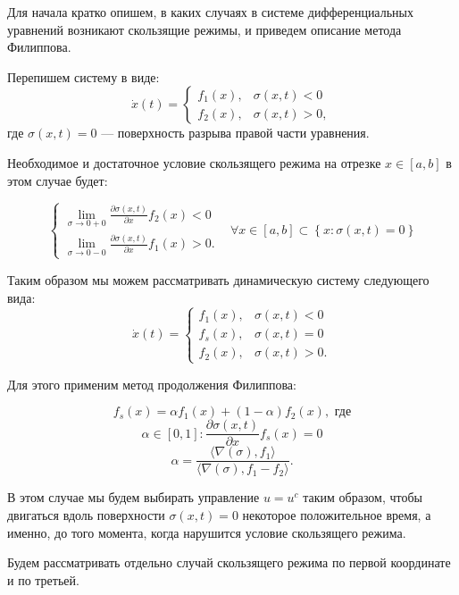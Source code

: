 \documentclass[11pt]{article}
\theoremstyle{definition}
\newcommand\Set[2]{\left\{ #1 \colon #2 \right\}}
\newcommand\dd[2]{\frac{\partial#1}{\partial#2}}
\begin{document}
	Для начала кратко опишем, в каких случаях в системе дифференциальных уравнений возникают скользящие режимы, и приведем описание метода Филиппова.

	Перепишем систему в виде:
$$\dot x(t) = \begin{cases} f_1(x), & \sigma(x,t) < 0 \\ f_2(x), & \sigma(x,t) > 0,\end{cases}$$
	где $\sigma(x,t) = 0$ --- поверхность разрыва правой части уравнения.

	Необходимое и достаточное условие скользящего режима на отрезке $x \in [a, b]$ в этом случае будет:

$$
\left\{
\begin{aligned}
    \lim_{\sigma \to 0+0}\dd{\sigma(x,t)}{x} f_2(x) < 0 \\
    \lim_{\sigma \to 0-0} \dd{\sigma(x,t)}{x} f_1(x) > 0.
\end{aligned}
\right.
\;\;\; \forall x \in [a, b] \subset \Set{x}{\sigma(x,t) = 0}
$$

	Таким образом мы можем рассматривать динамическую систему следующего вида:
$$\dot x(t) = \begin{cases} f_1(x), & \sigma(x,t) < 0 \\ f_s(x), & \sigma(x,t) = 0 \\ f_2(x), & \sigma(x,t) > 0.\end{cases}$$

 	Для этого применим метод продолжения Филиппова:

$$f_s(x) = \alpha f_1(x) + (1 - \alpha) f_2(x), \text{  где}$$
$$\alpha \in [0, 1] : \dd{\sigma(x,t)}{x} f_s(x) = 0$$
$$\alpha = \frac{\langle \nabla(\sigma), f_1\rangle}{\langle \nabla(\sigma), f_1 - f_2 \rangle}.$$

	В этом случае мы будем выбирать управление $u = u^c$ таким образом, чтобы двигаться вдоль поверхности $\sigma(x,t) = 0$ некоторое положительное время, а именно, до того момента, когда нарушится условие скользящего режима.

	Будем рассматривать отдельно случай скользящего режима по первой координате и по третьей.

\end{document}
